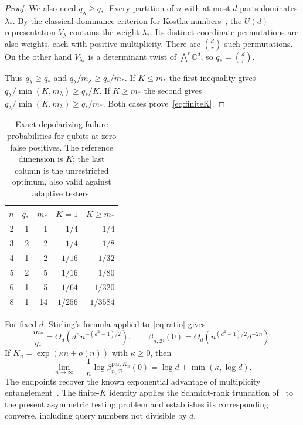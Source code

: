 \documentclass[11pt,a4paper]{article}
\theoremstyle{remark}\newtheorem{remark}[theorem]{Remark}
\newcommand{\bbC}{\mathbb C}
\begin{document}
\begin{proof}
We also need $q_\lambda\geq q_*$. Every partition of $n$ with at most $d$ parts dominates $\lambda_*$. By the classical dominance criterion for Kostka numbers~\cite[Chapter I]{macdonald}, the $U(d)$ representation $V_\lambda$ contains the weight $\lambda_*$. Its distinct coordinate permutations are also weights, each with positive multiplicity. There are $\binom dr$ such permutations. On the other hand $V_{\lambda_*}$ is a determinant twist of $\bigwedge^r\bbC^d$, so $q_*=\binom dr$.

Thus $q_\lambda\geq q_*$ and $q_\lambda/m_\lambda\geq q_*/m_*$. If $K\leq m_*$ the first inequality gives
\(q_\lambda/\min(K,m_\lambda)\geq q_*/K\).
If $K\geq m_*$ the second gives
\(q_\lambda/\min(K,m_\lambda)\geq q_*/m_*\).
Both cases prove~\eqref{eq:finiteK}.
\end{proof}

\begin{table}[t]
\centering
\caption{Exact depolarizing failure probabilities for qubits at zero false positives. The reference dimension is $K$; the last column is the unrestricted optimum, also valid against adaptive testers.}
\begin{tabular}{rrrrr}\toprule
$n$ & $q_*$ & $m_*$ & $K=1$ & $K\geq m_*$\\\midrule
2 & 1 & 1 & $1/4$ & $1/4$\\
3 & 2 & 2 & $1/4$ & $1/8$\\
4 & 1 & 2 & $1/16$ & $1/32$\\
5 & 2 & 5 & $1/16$ & $1/80$\\
6 & 1 & 5 & $1/64$ & $1/320$\\
8 & 1 & 14 & $1/256$ & $1/3584$\\\bottomrule
\end{tabular}
\end{table}

For fixed $d$, Stirling's formula applied to~\eqref{eq:ratio} gives
\begin{equation}
 \frac{m_*}{q_*}=\Theta_d\!\left(d^n n^{-(d^2-1)/2}\right),
 \qquad
 \beta_{n,\mathcal D}(0)=\Theta_d\!\left(n^{(d^2-1)/2}d^{-2n}\right).
\end{equation}
If $K_n=\exp(\kappa n+o(n))$ with $\kappa\geq0$, then
\begin{equation}
 \lim_{n\to\infty}-\frac1n\log\beta^{\mathrm{par},K_n}_{n,\mathcal D}(0)
 =\log d+\min(\kappa,\log d).
\end{equation}
The endpoints recover the known exponential advantage of multiplicity entanglement~\cite{chiribella}. The finite-$K$ identity applies the Schmidt-rank truncation of~\cite[Appendix B, Eqs.~(43)--(44)]{chiribella} to the present asymmetric testing problem and establishes its corresponding converse, including query numbers not divisible by $d$.
\end{document}
